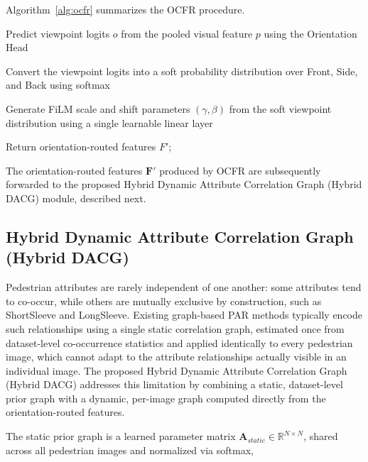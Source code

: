 \documentclass{ieeeaccess}
\begin{document}
Algorithm~\ref{alg:ocfr} summarizes the OCFR procedure.
\begin{algorithm}[H]
\caption{Orientation-Conditioned Feature Routing (OCFR)}
\label{alg:ocfr}

Predict viewpoint logits $o$ from the pooled visual feature $p$ using the Orientation Head\;

Convert the viewpoint logits into a soft probability distribution over Front, Side, and Back using softmax\;

Generate FiLM scale and shift parameters $(\gamma,\beta)$ from the soft viewpoint distribution using a single learnable linear layer\;


Return orientation-routed features $F'$;

\end{algorithm}

The orientation-routed features $\mathbf{F}'$ produced by OCFR are subsequently forwarded to the proposed Hybrid Dynamic Attribute Correlation Graph (Hybrid DACG) module, described next.

\subsection{Hybrid Dynamic Attribute Correlation Graph (Hybrid DACG)}

Pedestrian attributes are rarely independent of one another: some attributes tend to co-occur, while others are mutually exclusive by construction, such as ShortSleeve and LongSleeve. Existing graph-based PAR methods typically encode such relationships using a single static correlation graph, estimated once from dataset-level co-occurrence statistics and applied identically to every pedestrian image, which cannot adapt to the attribute relationships actually visible in an individual image. The proposed Hybrid Dynamic Attribute Correlation Graph (Hybrid DACG) addresses this limitation by combining a static, dataset-level prior graph with a dynamic, per-image graph computed directly from the orientation-routed features.

The static prior graph is a learned parameter matrix $\mathbf{A}_{static}\in\mathbb{R}^{N\times N}$, shared across all pedestrian images and normalized via softmax,
\end{document}
